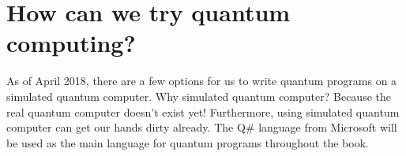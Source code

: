 \section{\textbf{How} can we try quantum computing?}

\begin{fullwidth}

As of April 2018, there are a few options for us to write quantum programs on a simulated quantum computer.
Why simulated quantum computer? Because the real quantum computer doesn't exist yet!
Furthermore, using simulated quantum computer can get our hands dirty already.
The Q\# language from Microsoft will be used as the main language for quantum programs throughout the book.

\end{fullwidth}
